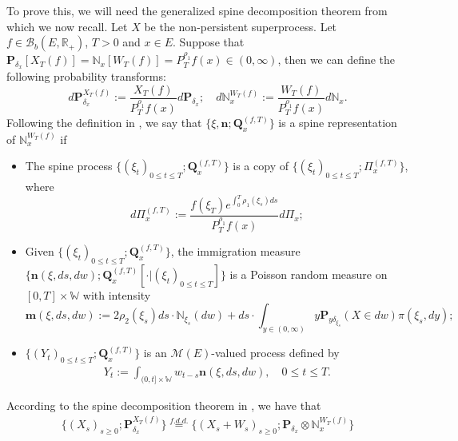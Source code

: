 \documentclass[12pt,a4paper]{amsart}
\theoremstyle{plain}
\theoremstyle{definition}
\numberwithin{equation}{section}
\begin{document}
    To prove this, we will need the generalized spine decomposition theorem from \cite{RenSongSun2017Spine} which we now recall.
    Let $X$ be the non-persistent superprocess.
    Let $f\in \mathcal B_b(E,\mathbb R_+)$, $T >0$ and $x\in E$.
    Suppose that $\mathbf P_{\delta_x}[X_T(f)] = \mathbb N_x[W_T(f)] = P^{\rho_1}_T f(x) \in (0,\infty)$, then we can define the following probability transforms:
\begin{equation}
    d\mathbf P_{\delta_x}^{X_T(f)}
   := \frac{X_T(f)}{P_T^{\rho_1} f(x)} d\mathbf P_{\delta_x};
    \quad d\mathbb N_x^{W_T(f)}
    :=  \frac{W_T(f)}{P_T^{\rho_1} f(x)} d\mathbb N_x.
\end{equation}
    Following the definition in \cite{RenSongSun2017Spine}, we say that $\{\xi, \mathbf n;\mathbf Q_{x}^{(f,T)}\}$ is a spine representation of $\mathbb N_x^{W_T(f)}$ if
\begin{itemize}
\item
    The spine process $\{(\xi_t)_{0\leq t\leq T}; \mathbf Q^{(f,T)}_x\}$ is a copy of $\{(\xi_t)_{0\leq t\leq T}; \Pi^{(f,T)}_{x}\}$,
    where
\begin{equation}
    d\Pi_x^{(f,T)} := \frac{f(\xi_T)e^{\int_0^T \rho_1(\xi_s)ds}}{P^{\rho_1}_T f(x)} d \Pi_x;
\end{equation}
\item
    Given $\{(\xi_t)_{0\leq t\leq T}; \mathbf Q^{(f,T)}_x\}$, the immigration measure $\{\mathbf n(\xi,ds,dw); \mathbf Q^{(f,T)}_x[\cdot |(\xi_t)_{0\leq t\leq T}]\}$ is a Poisson random measure on $[0,T] \times \mathbb W$ with intensity
\begin{equation}
\label{eq: conditional intensity}
    \mathbf m(\xi,ds,dw)
    := 2 \rho_2(\xi_s) ds \cdot \mathbb N_{\xi_s}(dw) + ds \cdot \int_{y\in (0,\infty)} y \mathbf P_{y\delta_{\xi_s}}(X\in dw) \pi(\xi_s,dy);
\end{equation}
\item
    $\{(Y_t)_{0\leq t\leq T}; \mathbf Q^{(f,T)}_x\}$ is an $\mathcal M(E)$-valued process defined by
\begin{equation}\begin{split}
    Y_t
    := \int_{(0,t] \times \mathbb W} w_{t-s} \mathbf n(\xi,ds,dw),
    \quad 0 \leq t\leq T.
\end{split}\end{equation}
\end{itemize}
    According to the spine decomposition theorem in \cite{RenSongSun2017Spine}, we have that
\begin{equation}\begin{split}
\label{eq: Spine decomposition 1}
    \{(X_s)_{s \geq 0};\mathbf P_{\delta_x}^{X_T(f)}\}
    \overset{f.d.d.}{=} \{(X_s + W_s)_{s \geq 0};\mathbf P_{\delta_x} \otimes \mathbb N_x^{W_T(f)} \}
\end{split}\end{equation}
\end{document}
